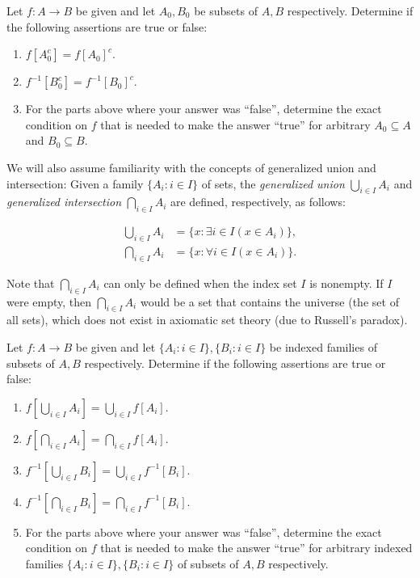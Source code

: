 \begin{exercise}
  Let $f:A\to B$ be given and let $A_0, B_0$ be subsets of $A,B$ respectively.
  Determine if the following assertions are true or false:
  \begin{enumerate}
  \item
    $f[A_0^c] = f[A_0]^c$.
  \item
    $f^{-1}[B_0^c] = f^{-1}[B_0]^c$.
  \item[(\theenumi)*]
    For the parts above where your answer was “false”, determine the exact condition on $f$ that is needed to make the answer “true”  for arbitrary $A_0\subseteq A$ and $B_0\subseteq B$.

  \end{enumerate}
\end{exercise}

We will also assume familiarity with the concepts of generalized union and intersection:
Given a  family $\{A_i \colon i\in I\}$ of sets, the \emph{generalized union} $\bigcup_{i\in I} A_i$ and \emph{generalized intersection} $\bigcap_{i\in I} A_i$ are defined, respectively, as follows:

\begin{align*}
\bigcup_{i\in I} A_i & =\{x \colon \exists i\in I(x\in A_i)\}, \\
\bigcap_{i\in I} A_i & =\{x \colon \forall i\in I(x\in A_i)\}.
\end{align*}

\begin{remark}
  Note that $\bigcap_{i\in I} A_i $ can only be defined when the index set $I$ is nonempty.
  If $I$ were empty, then $\bigcap_{i\in I} A_i $ would be a set that contains the universe (the set of all sets), which does not exist in axiomatic set theory (due to Russell’s paradox).
\end{remark}

\begin{exercise}
  Let $f:A\to B$ be given and let $\{A_i \colon i\in I\}, \{B_i \colon i\in I\}$ be indexed families of subsets of $A,B$ respectively.
  Determine if the following assertions are true or false:
  \begin{enumerate}
  \item
    $f[\bigcup_{i\in I} A_i] =  \bigcup_{i\in I} f[A_i]$.
  \item
    $f[\bigcap_{i\in I} A_i] = \bigcap_{i\in I} f[A_i]$.
  \item
    $f^{-1}[\bigcup_{i\in I} B_i] =  \bigcup_{i\in I} f^{-1}[B_i]$.
  \item
    $f^{-1}[\bigcap_{i\in I}B_i] =  \bigcap_{i\in I} f^{-1}[B_i]$.
  \item[(\theenumi)*]
    For the parts above where your answer was “false”, determine the exact condition on $f$ that is needed to make the answer “true” for arbitrary indexed families $\{A_i \colon i\in I\}, \{B_i \colon i\in I\}$  of subsets of $A,B$ respectively.

  \end{enumerate}
\end{exercise}


